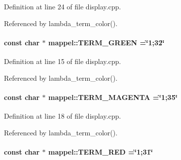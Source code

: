 Definition at line 24 of file display.\+cpp.



Referenced by lambda\+\_\+term\+\_\+color().

\paragraph[{\texorpdfstring{T\+E\+R\+M\+\_\+\+G\+R\+E\+EN}{TERM_GREEN}}]{\setlength{\rightskip}{0pt plus 5cm}const char $\ast$ mappel\+::\+T\+E\+R\+M\+\_\+\+G\+R\+E\+EN =\char`\"{}1;32\char`\"{}}\hypertarget{namespacemappel_a7beb463b118be1cd8c591eaf053d7f5c}{}\label{namespacemappel_a7beb463b118be1cd8c591eaf053d7f5c}


Definition at line 15 of file display.\+cpp.



Referenced by lambda\+\_\+term\+\_\+color().

\paragraph[{\texorpdfstring{T\+E\+R\+M\+\_\+\+M\+A\+G\+E\+N\+TA}{TERM_MAGENTA}}]{\setlength{\rightskip}{0pt plus 5cm}const char $\ast$ mappel\+::\+T\+E\+R\+M\+\_\+\+M\+A\+G\+E\+N\+TA =\char`\"{}1;35\char`\"{}}\hypertarget{namespacemappel_a2b80f7559dbf8fd1650220f75db541b2}{}\label{namespacemappel_a2b80f7559dbf8fd1650220f75db541b2}


Definition at line 18 of file display.\+cpp.



Referenced by lambda\+\_\+term\+\_\+color().

\paragraph[{\texorpdfstring{T\+E\+R\+M\+\_\+\+R\+ED}{TERM_RED}}]{\setlength{\rightskip}{0pt plus 5cm}const char $\ast$ mappel\+::\+T\+E\+R\+M\+\_\+\+R\+ED =\char`\"{}1;31\char`\"{}}\hypertarget{namespacemappel_ab22998f4999661d300fe1f1e2bc615a2}{}\label{namespacemappel_ab22998f4999661d300fe1f1e2bc615a2}


